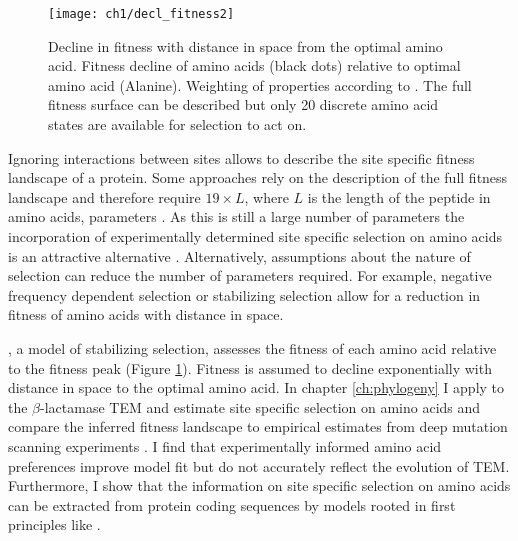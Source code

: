 \singlespacing
\begin{figure}
     \centering
	\texttt{[image: ch1/decl\_fitness2]}
	\caption{Decline in fitness with distance in \PC space from the optimal amino acid. 
	Fitness decline of amino acids (black dots) relative to optimal amino acid (Alanine). Weighting of \PC properties according to \citet{grantham1974}.
	The full fitness surface can be described but only 20 discrete amino acid states are available for selection to act on.}
	\label{fig:decl_fit}
\end{figure}
\doublespacing

Ignoring interactions between sites allows to describe the site specific fitness landscape of a protein.
Some approaches rely on the description of the full fitness landscape and therefore require $19 \times L$, where $L$ is the length of the peptide in amino acids, parameters \citep{LartillotAndPhilippe2004,le2008,wang2008,holder2008,wu2013,tamuri2014}.
As this is still a large number of parameters the incorporation of experimentally determined site specific selection on amino acids is an attractive alternative \citep{bloom2014, thyagarajan2014, bloom2017}. 
Alternatively, assumptions about the nature of selection can reduce the number of parameters required.
For example, negative frequency dependent selection \citep{GoldmanAndYang1994, MuseAndGaut1994, thorne1996} or stabilizing selection \citep{beaulieu2018} allow for a reduction in fitness of amino acids with distance in \PC space.

\selac \citep{beaulieu2018}, a model of stabilizing selection, assesses the fitness of each amino acid relative to the fitness peak (Figure \ref{fig:decl_fit}).
Fitness is assumed to decline exponentially with distance in \PC space to the optimal amino acid.
In chapter \ref{ch:phylogeny} I apply \selac to the $\beta$-lactamase TEM and estimate site specific selection on amino acids and compare the inferred fitness landscape to empirical estimates from deep mutation scanning experiments \citep{stiffler2016}.
I find that experimentally informed amino acid preferences improve model fit but do not accurately reflect the evolution of TEM.
Furthermore, I show that the information on site specific selection on amino acids can be extracted from protein coding sequences by models rooted in first principles like \selac.




